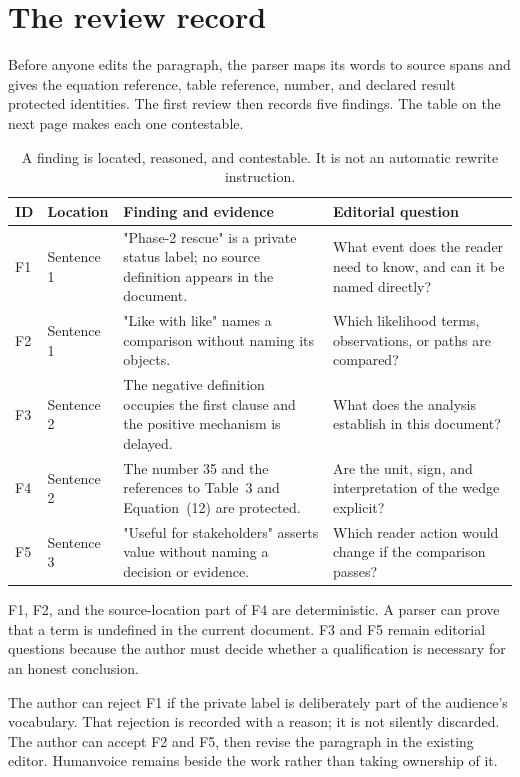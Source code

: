 \section{The review record}

Before anyone edits the paragraph, the parser maps its words to source spans
and gives the equation reference, table reference, number, and declared result
protected identities. The first review then records five findings. The table on
the next page makes each one contestable.

\begin{table}[H]
\centering
\small
\begin{tabularx}{\textwidth}{@{}p{}p{}L p{0.22\textwidth}@{}}
\toprule
ID & Location & Finding and evidence & Editorial question \\
\midrule
F1 & Sentence 1 & "Phase-2 rescue" is a private status label; no source
definition appears in the document. & What event does the reader need to know,
and can it be named directly? \\
F2 & Sentence 1 & "Like with like" names a comparison without naming its
objects. & Which likelihood terms, observations, or paths are compared? \\
F3 & Sentence 2 & The negative definition occupies the first clause and the
positive mechanism is delayed. & What does the analysis establish in this
document? \\
F4 & Sentence 2 & The number 35 and the references to Table~3 and Equation~(12)
are protected. & Are the unit, sign, and interpretation of the wedge explicit? \\
F5 & Sentence 3 & "Useful for stakeholders" asserts value without naming a
decision or evidence. & Which reader action would change if the comparison
passes? \\
\bottomrule
\end{tabularx}
\caption{A finding is located, reasoned, and contestable. It is not an automatic
rewrite instruction.}
\label{tab:worked-findings}
\end{table}

F1, F2, and the source-location part of F4 are deterministic. A parser can
prove that a term is undefined in the current document. F3 and F5 remain
editorial questions because the author must decide whether a qualification is
necessary for an honest conclusion.

The author can reject F1 if the private label is deliberately part of the
audience's vocabulary. That rejection is recorded with a reason; it is not
silently discarded. The author can accept F2 and F5, then revise the paragraph
in the existing editor. Humanvoice remains beside the work rather than taking
ownership of it.


